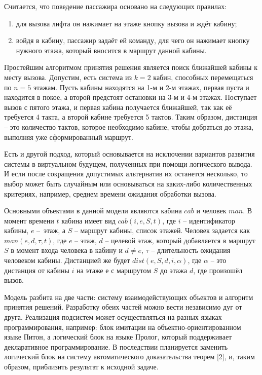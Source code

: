 Считается, что поведение пассажира основано на следующих правилах:
\begin{enumerate}
\item для вызова лифта он нажимает на этаже кнопку вызова и ждёт кабину;
\item войдя в кабину, пассажир задаёт ей команду, для чего он нажимает кнопку нужного этажа, который вносится в маршрут данной кабины.
\end{enumerate}

Простейшим алгоритмом принятия решения является поиск ближайшей кабины к месту вызова. %
Допустим, есть система из $k = 2$ кабин, способных перемещаться по \(n = 5\) этажам. Пусть кабины находятся на 1-м и 2-м этажах, первая пуста и находится в покое, а второй предстоят остановки на 3-м и 4-м этажах. Поступает вызов с пятого этажа, и первая кабина получается ближайшей, так как её требуется 4 такта, а второй кабине требуется 5 тактов.  Таким образом, дистанция -- это количество тактов, которое необходимо кабине, чтобы добраться до этажа, выполняя уже сформированный маршрут.

Есть и другой подход, который основывается на исключении вариантов развития системы в виртуальном будущем, полученных при помощи логического вывода. И если после сокращения допустимых альтернатив их останется несколько, то выбор может быть случайным или основываться на каких-либо количественных критериях, например, среднем времени ожидания обработки вызова.

Основными объектами в данной модели являются кабина $cab$ и человек $man$. В момент времени $t$ кабина имеет вид $cab(i, e, S, t)$, где $i$ -- идентификатор кабины, $e$ -- этаж, а $S$ -- маршрут кабины, список этажей. Человек задается как $man(e, d, \tau, t)$, где $e$ -- этаж, $d$ -- целевой этаж, который добавляется в маршрут $S$ в момент входа человека в кабину и $d \neq e$, $\tau$ -- длительность ожидания человеком кабины. Дистанцией же будет $dist(e, S, d, i, \alpha)$, где $\alpha$ -- это дистанция от кабины $i$ на этаже $е$ с маршрутом $S$ до этажа $d$, где произошёл вызов.

Модель разбита на две части: систему взаимодействующих объектов и алгоритм принятия решений. Разработку обеих частей можно вести независимо дуг от друга.  Реализация подсистем может осуществляться на разных языках программирования, например: блок имитации на объектно-ориентированном языке Питон, а логический блок на языке Пролог, который поддерживает декларативное программирование. В последствии планируется заменить логический блок на систему автоматического доказательства теорем [2], и, таким образом, приблизить результат к исходной задаче.


